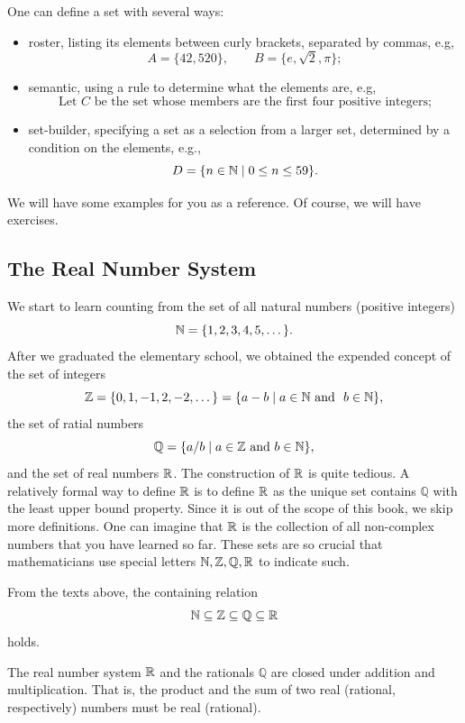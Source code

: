 \documentclass[11pt]{book}
\begin{document}
One can define a set with several ways:
\begin{itemize}
    \item roster, listing its elements between curly brackets, separated by commas, e.g, $$A=\{42, 520\}, \qquad B=\{e, \sqrt{2}, \pi\};$$
    \item semantic, using a rule to determine what the elements are, e.g, $$\text{Let $C$ be the set whose members are the first four positive integers;}$$
    \item set-builder, specifying a set as a selection from a larger set, determined by a condition on the elements, e.g., $$D=\{n\in\mathbb{N}\mid 0\leq n\leq 59\}.$$
\end{itemize}

We will have some examples for you as a reference. Of course, we will have exercises.

\subsection*{The Real Number System}

We start to learn counting from the set of all natural numbers (positive integers) $$\mathbb{N}=\{1, 2, 3, 4, 5, \dots\}.$$ After we graduated the elementary school, we obtained the expended concept of the set of integers $$\mathbb{Z}=\{0, 1, -1, 2, -2, \dots\}=\{a - b\mid a\in\mathbb{N}\text{\ and \ }b\in\mathbb{N}\},$$ the set of ratial numbers $$\mathbb{Q}=\{a/b\mid a\in\mathbb{Z}\text{\ and\ }b\in\bbN\},$$ and the set of real numbers $\mathbb{R}$. The construction of $\mathbb{R}$ is quite tedious. A relatively formal way to define $\mathbb{R}$ is to define $\mathbb{R}$ as the unique set contains $\mathbb{Q}$ with the least upper bound property. Since it is out of the scope of this book, we skip more definitions. One can imagine that $\mathbb{R}$ is the collection of all non-complex numbers that you have learned so far. These sets are so crucial that mathematicians use special letters $\mathbb{N}, \mathbb{Z}, \mathbb{Q}, \mathbb{R}$ to indicate such.

\begin{corollary}
    From the texts above, the containing relation $$\mathbb{N}\subseteq\mathbb{Z}\subseteq\mathbb{Q}\subseteq\mathbb{R}$$ holds.
\end{corollary}

\begin{proposition} The real number system $\mathbb{R}$ and the rationals $\mathbb{Q}$ are closed under addition and multiplication. That is, the product and the sum of two real (rational, respectively) numbers must be real (rational).
\end{proposition}
\end{document}
